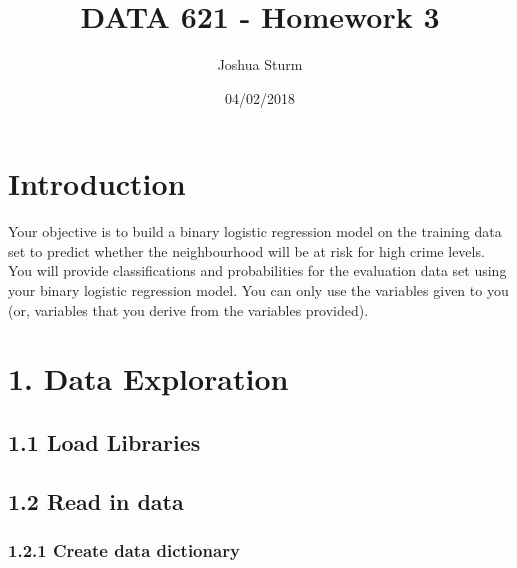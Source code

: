 \documentclass[]{article}
\title{DATA 621 - Homework 3}
\author{Joshua Sturm}
\date{04/02/2018}
\begin{document}
\maketitle

\section{Introduction}\label{introduction}

Your objective is to build a binary logistic regression model on the
training data set to predict whether the neighbourhood will be at risk
for high crime levels. You will provide classifications and
probabilities for the evaluation data set using your binary logistic
regression model. You can only use the variables given to you (or,
variables that you derive from the variables provided).

\section{1. Data Exploration}\label{data-exploration}

\subsection{1.1 Load Libraries}\label{load-libraries}

\subsection{1.2 Read in data}\label{read-in-data}

\subsubsection{1.2.1 Create data
dictionary}\label{create-data-dictionary}
\end{document}
